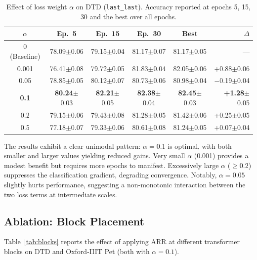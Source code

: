 \documentclass[review,12pt,authoryear]{elsarticle}
\newcommand{\std}[1]{{\scriptsize$\pm$#1}}
\newcommand{\method}{ARR}
\begin{document}
\begin{table}[t]
\centering
\caption{Effect of loss weight $\alpha$ on DTD (\texttt{last\_last}). Accuracy reported at epochs 5, 15, 30 and the best over all epochs.}
\label{tab:alpha}
\small
\begin{tabular}{cccccr}
\toprule
$\alpha$ & Ep.\ 5 & Ep.\ 15 & Ep.\ 30 & Best & $\Delta$ \\
\midrule
0 (Baseline) & 78.09\std{0.06} & 79.15\std{0.04} & 81.17\std{0.07} & 81.17\std{0.05} & --- \\
0.001        & 76.41\std{0.08} & 79.72\std{0.05} & 81.83\std{0.04} & 82.05\std{0.06} & +0.88\std{0.06} \\
0.05         & 78.85\std{0.05} & 80.12\std{0.07} & 80.73\std{0.06} & 80.98\std{0.04} & $-$0.19\std{0.04} \\
\textbf{0.1} & \textbf{80.24}\std{0.03} & \textbf{82.21}\std{0.05} & \textbf{82.38}\std{0.04} & \textbf{82.45}\std{0.03} & \textbf{+1.28}\std{0.05} \\
0.2          & 79.15\std{0.06} & 79.43\std{0.08} & 81.28\std{0.05} & 81.42\std{0.06} & +0.25\std{0.05} \\
0.5          & 77.18\std{0.07} & 79.33\std{0.06} & 80.61\std{0.08} & 81.24\std{0.05} & +0.07\std{0.04} \\
\bottomrule
\end{tabular}
\end{table}

The results exhibit a clear unimodal pattern: $\alpha = 0.1$ is optimal, with both smaller and larger values yielding reduced gains.
Very small $\alpha$ (0.001) provides a modest benefit but requires more epochs to manifest.
Excessively large $\alpha$ ($\geq 0.2$) suppresses the classification gradient, degrading convergence.
Notably, $\alpha = 0.05$ slightly hurts performance, suggesting a non-monotonic interaction between the two loss terms at intermediate scales.

\subsection{Ablation: Block Placement}
\label{sec:exp:blocks}

Table~\ref{tab:blocks} reports the effect of applying \method{} at different transformer blocks on DTD and Oxford-IIIT Pet (both with $\alpha = 0.1$).
\end{document}
